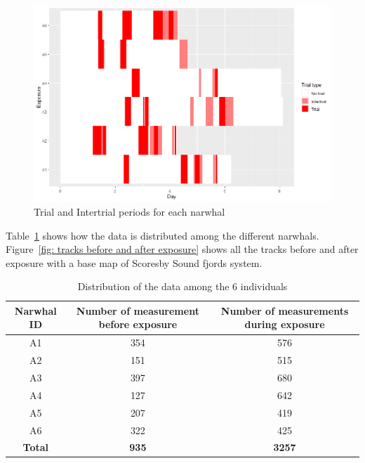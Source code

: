\documentclass[11pt]{article}
\newcommand {\1}{\mathbb{1}}
\theoremstyle{definition}
\theoremstyle{remark}
\theoremstyle{remark}
\begin{document}
	\begin{figure}[H]
		\centering
			\centering
			\includegraphics[scale=0.5]{images/data_exploration/trials.png}
			\caption{Trial and Intertrial periods for each narwhal}
			\label{fig: trials and intertrials distributions}
		
	\end{figure}
 
 Table~\ref{table: data distribution}  shows how the data is distributed among the different narwhals. Figure~\ref{fig: tracks before and after exposure} shows all the tracks before and after exposure with a base map of Scoresby Sound fjords system.

\begin{table}[H]
	\centering
	\begin{tabular}{|c|c|c|}
		\hline
		Narwhal ID & Number of measurement before exposure & Number of measurements during exposure \\
		\hline
		A1 & 354 & 576\\
		\hline
		A2  & 151 & 515 \\
		\hline
		A3 & 397 & 680 \\
		\hline
		A4 & 127 & 642  \\
		\hline
		A5 & 207 & 419\\
		\hline
		A6 & 322 & 425 \\
		\hline
		\textbf{Total} & \textbf{935} & \textbf{3257} \\
		\hline
	\end{tabular}
	\caption{Distribution of the data among the 6 individuals}
	\label{table: data distribution}
\end{table}
\end{document}
